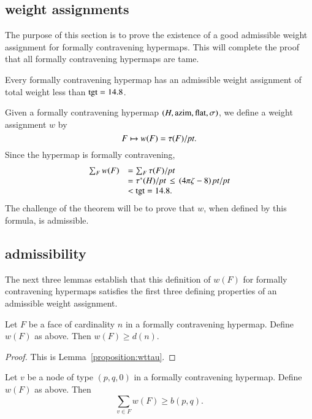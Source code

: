 \subsection{weight assignments}
    \label{sec:weight}

The purpose of this section is to prove the existence of a good
admissible weight assignment for formally contravening hypermaps.
This will complete the proof that all formally contravening
hypermaps are tame.

\begin{theorem}  Every formally contravening hypermap has an admissible
weight assignment of total weight less than ${\operatorname{tgt}}=14.8$.
\end{theorem}

Given a formally contravening hypermap $(H,{\operatorname{azim}},\operatorname{flat},\sigma)$, we
define a weight assignment $w$ by
    $$F \mapsto w(F) = \tau(F)/\hbox{\it pt}.$$
Since the hypermap is formally contravening,
    $$
    \begin{array}{lll}
    \sum_F w(F) &= \sum_F \tau(F)/\hbox{\it pt} \\
            &= \tau^*(H)/\hbox{\it pt}\,\le\,(4\pi\zeta-8)\,\hbox{\it pt}/\hbox{\it pt} \\
        &< {\operatorname{tgt}}=14.8.
    \end{array}
    $$
The challenge of the theorem will be to prove that $w$, when
defined by this formula, is admissible.

\subsection{admissibility}
\label{sec:admissibility}

The next three lemmas establish that this definition of $w(F)$ for
formally contravening hypermaps satisfies the first three defining
properties of an admissible weight assignment.

\begin{lemma}  Let $F$ be a face of cardinality $n$ in a formally contravening hypermap.
Define $w(F)$ as above. Then
        $w(F) \ge d(n)$.
\end{lemma}

\begin{proof} This is Lemma~\ref{proposition:wttau}.
\end{proof}

\begin{lemma} Let $v$ be a node of type $(p,q,0)$ in a
formally contravening hypermap.  Define $w(F)$ as above. Then
        $$\sum_{v\in F} w(F) \ge b(p,q).$$
\end{lemma}


